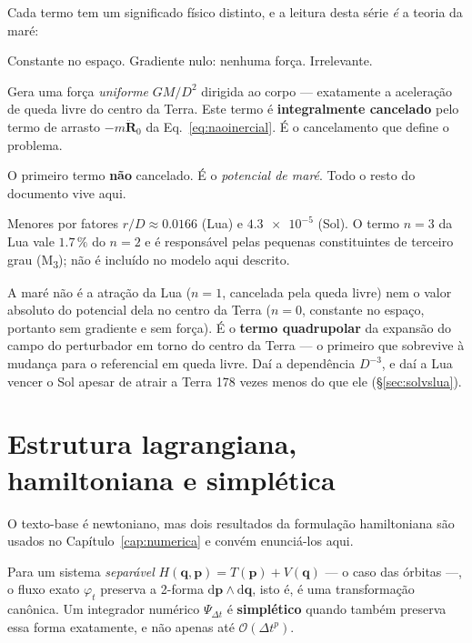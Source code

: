 \documentclass[11pt,a4paper,oneside]{report}
\theoremstyle{definition}
\theoremstyle{plain}
\theoremstyle{remark}
\newcommand{\vect}[1]{\bm{#1}}
\newcommand{\dd}{\mathrm{d}}
\newcommand{\ordem}[1]{\mathcal{O}\!\left(#1\right)}
\begin{document}
Cada termo tem um significado físico distinto, e a leitura desta série
\emph{é} a teoria da maré:

\begin{description}[leftmargin=1.6cm,style=nextline]
\item[$n=0$: $\;-GM/D$] Constante no espaço. Gradiente nulo: nenhuma força.
  Irrelevante.
\item[$n=1$: $\;-\dfrac{GM r}{D^{2}}\cos\psi$] Gera uma força
  \emph{uniforme} $GM/D^{2}$ dirigida ao corpo — exatamente a aceleração de
  queda livre do centro da Terra. Este termo é \textbf{integralmente cancelado}
  pelo termo de arrasto $-m\ddot{\vect{R}}_0$ da Eq.~\eqref{eq:naoinercial}.
  É o cancelamento que define o problema.
\item[$n=2$: $\;-\dfrac{GM r^{2}}{D^{3}}P_2(\cos\psi)$] O primeiro termo
  \textbf{não} cancelado. É o \emph{potencial de maré}. Todo o resto do
  documento vive aqui.
\item[$n\ge 3$] Menores por fatores $r/D\approx\num{0.0166}$ (Lua) e
  $\num{4.3e-5}$ (Sol). O termo $n=3$ da Lua vale $1.7\,\%$ do $n=2$ e é
  responsável pelas pequenas constituintes de terceiro grau (M\textsubscript{3});
  não é incluído no modelo aqui descrito.
\end{description}

\begin{caixa}
A maré não é a atração da Lua ($n=1$, cancelada pela queda livre) nem o valor
absoluto do potencial dela no centro da Terra ($n=0$, constante no espaço,
portanto sem gradiente e sem força). É o \textbf{termo quadrupolar} da expansão do
campo do perturbador em torno do centro da Terra — o primeiro que sobrevive à
mudança para o referencial em queda livre. Daí a dependência $D^{-3}$, e daí a
Lua vencer o Sol apesar de atrair a Terra 178 vezes menos do que ele
(\S\ref{sec:solvslua}).
\end{caixa}

\section{Estrutura lagrangiana, hamiltoniana e simplética}
\label{sec:simpletica}

O texto-base é newtoniano, mas dois resultados da formulação hamiltoniana são
usados no Capítulo~\ref{cap:numerica} e convém enunciá-los aqui.

Para um sistema \emph{separável} $H(\vect{q},\vect{p})=T(\vect{p})+V(\vect{q})$
— o caso das órbitas —, o fluxo exato $\varphi_t$ preserva a 2-forma
$\dd\vect{p}\wedge\dd\vect{q}$, isto é, é uma transformação canônica. Um
integrador numérico $\Psi_{\Delta t}$ é \textbf{simplético} quando também
preserva essa forma exatamente, e não apenas até $\ordem{\Delta t^{p}}$.
\end{document}
